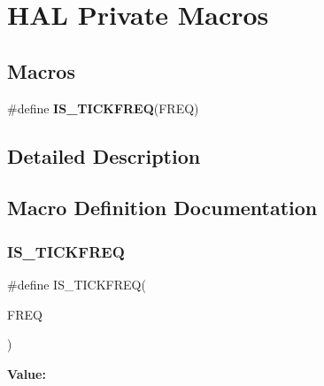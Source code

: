 \hypertarget{group___h_a_l___private___macros}{}\section{H\+AL Private Macros}
\label{group___h_a_l___private___macros}
\subsection*{Macros}
\begin{DoxyCompactItemize}
\item 
\#define {\bfseries I\+S\+\_\+\+T\+I\+C\+K\+F\+R\+EQ}(F\+R\+EQ)
\end{DoxyCompactItemize}


\subsection{Detailed Description}


\subsection{Macro Definition Documentation}
\mbox{\label{group___h_a_l___private___macros_ga2a86bf8a89ad75716cd92e932a8ae71e}} 
\subsubsection{\texorpdfstring{IS\_TICKFREQ}{IS\_TICKFREQ}}
{\footnotesize\ttfamily \#define I\+S\+\_\+\+T\+I\+C\+K\+F\+R\+EQ(\begin{DoxyParamCaption}\item[{}]{F\+R\+EQ }\end{DoxyParamCaption})}

{\bfseries Value\+:}
\begin{DoxyCode}{0}

\end{DoxyCode}

